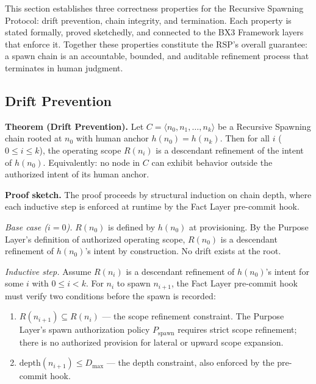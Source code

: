 This section establishes three correctness properties for the Recursive Spawning Protocol: drift prevention, chain integrity, and termination. Each property is stated formally, proved sketchedly, and connected to the BX3 Framework layers that enforce it. Together these properties constitute the RSP's overall guarantee: a spawn chain is an accountable, bounded, and auditable refinement process that terminates in human judgment.

\subsection{Drift Prevention}
\label{sec:rs-drift-prevention-proof}

\medskip
\noindent\textbf{Theorem (Drift Prevention).} Let $C = \langle n_0, n_1, \ldots, n_k \rangle$ be a Recursive Spawning chain rooted at $n_0$ with human anchor $h(n_0) = h(n_k)$. Then for all $i$ ($0 \leq i \leq k$), the operating scope $R(n_i)$ is a descendant refinement of the intent of $h(n_0)$. Equivalently: no node in $C$ can exhibit behavior outside the authorized intent of its human anchor.

\medskip
\noindent\textbf{Proof sketch.} The proof proceeds by structural induction on chain depth, where each inductive step is enforced at runtime by the Fact Layer pre-commit hook.

\medskip
\textit{Base case ($i=0$).} $R(n_0)$ is defined by $h(n_0)$ at provisioning. By the Purpose Layer's definition of authorized operating scope, $R(n_0)$ is a descendant refinement of $h(n_0)$'s intent by construction. No drift exists at the root.

\medskip
\textit{Inductive step.} Assume $R(n_i)$ is a descendant refinement of $h(n_0)$'s intent for some $i$ with $0 \leq i < k$. For $n_i$ to spawn $n_{i+1}$, the Fact Layer pre-commit hook must verify two conditions before the spawn is recorded:

\begin{enumerate}
    \item[(a)] $R(n_{i+1}) \subseteq R(n_i)$ — the scope refinement constraint. The Purpose Layer's spawn authorization policy $P_{\mathrm{spawn}}$ requires strict scope refinement; there is no authorized provision for lateral or upward scope expansion.
    \item[(b)] $\mathrm{depth}(n_{i+1}) \leq D_{\mathrm{max}}$ — the depth constraint, also enforced by the pre-commit hook.
\end{enumerate}

